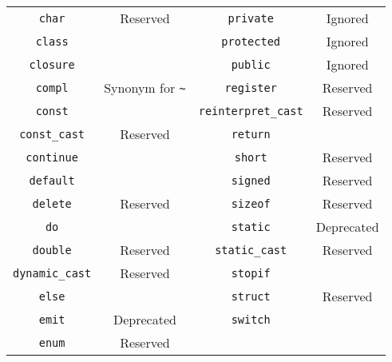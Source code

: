 \begin{table}[\floatpos]
\begin{tabular}{|c|c||c|c|}
    \lstinline"char"              & Reserved                         &
    \lstinline"private"           & Ignored                          \\
    \lstinline"class"             &                                  &
    \lstinline"protected"         & Ignored                          \\
    \lstinline"closure"           &                                  &
    \lstinline"public"            & Ignored                          \\
    \lstinline"compl"             & Synonym for \lstinline|~|        &
    \lstinline"register"          & Reserved                         \\
    \lstinline"const"             &                                  &
    \lstinline"reinterpret_cast"  & Reserved                         \\
    \lstinline"const_cast"        & Reserved                         &
    \lstinline"return"            &                                  \\
    \lstinline"continue"          &                                  &
    \lstinline"short"             & Reserved                         \\
    \lstinline"default"           &                                  &
    \lstinline"signed"            & Reserved                         \\
    \lstinline"delete"            & Reserved                         &
    \lstinline"sizeof"            & Reserved                         \\
    \lstinline"do"                &                                  &
    \lstinline"static"            & Deprecated                       \\
    \lstinline"double"            & Reserved                         &
    \lstinline"static_cast"       & Reserved                         \\
    \lstinline"dynamic_cast"      & Reserved                         &
    \lstinline"stopif"            &                                  \\
    \lstinline"else"              &                                  &
    \lstinline"struct"            & Reserved                         \\
    \lstinline"emit"              & Deprecated                       &
    \lstinline"switch"            &                                  \\
    \lstinline"enum"              & Reserved                         &

\end{tabular}
\end{table}
